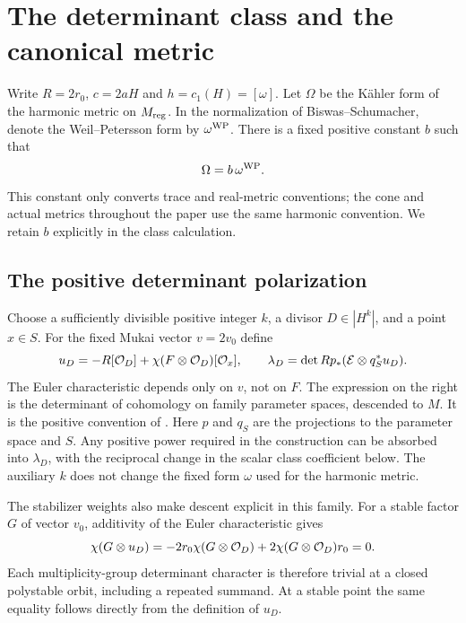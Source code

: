 \section{The determinant class and the canonical metric}\label{sec:canonical}

Write $R=2r_0$, $c=2aH$ and $h=c_1(H)=[\omega]$.
Let $\Omega$ be the K\"ahler form of the harmonic metric
on $M_{\mathrm{reg}}$. In the normalization of
Biswas--Schumacher, denote the Weil--Petersson form by
$\omega^{\mathrm{WP}}$. There is a fixed positive constant $b$
such that
\begin{equation}\label{eq:WP-normalization}
 \Omega=b\,\omega^{\mathrm{WP}}.
\end{equation}
This constant only converts trace and real-metric conventions;
the cone and actual metrics throughout the paper use the
same harmonic convention. We retain $b$ explicitly in
the class calculation.

\subsection{The positive determinant polarization}
Choose a sufficiently divisible positive integer $k$, a
divisor $D\in|H^k|$, and a point $x\in S$. For the fixed
Mukai vector $v=2v_0$ define
\begin{equation}\label{eq:determinant-class}
 u_D=-R[\mathcal O_D]+\chi(F\otimes\mathcal O_D)[\mathcal O_x],
 \qquad
 \lambda_D=\det Rp_*(\mathcal E\otimes q_S^*u_D).
\end{equation}
The Euler characteristic depends only on $v$, not on $F$.
The expression on the right is the determinant of cohomology
on family parameter spaces, descended to $M$. It is the
positive convention of
\cite[Definition~8.1.9]{hl97}. Here $p$ and $q_S$ are the
projections to the parameter space and $S$. Any positive
power required in the construction can be absorbed into
$\lambda_D$, with the reciprocal change in the scalar
class coefficient below. The auxiliary $k$ does not change
the fixed form $\omega$ used for the harmonic metric.

The stabilizer weights also make descent explicit in this
family. For a stable factor $G$ of vector $v_0$, additivity
of the Euler characteristic gives
\[
 \chi(G\otimes u_D)
 =-2r_0\chi(G\otimes\mathcal O_D)
             +2\chi(G\otimes\mathcal O_D)r_0=0.
\]
Each multiplicity-group determinant character is therefore
trivial at a closed polystable orbit, including a repeated
summand. At a stable point the same equality follows directly
from the definition of $u_D$.

